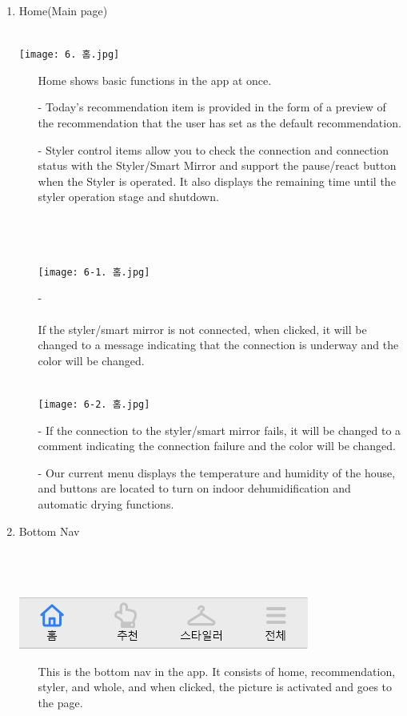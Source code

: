 \documentclass[conference]{IEEEtran}
\begin{document}
\begin{enumerate}
\begin{enumerate}
\end{enumerate}
\item Home(Main page)\\ \\
\centerline{\texttt{[image: 6. 홈.jpg]}}
\begin{itemize}
    \item[] Home shows basic functions in the app at once.
\end{itemize}
 \begin{enumerate}
 \item[-] Today's recommendation item is provided in the form of a preview of the recommendation that the user has set as the default recommendation.
 \item[-] Styler control items allow you to check the connection and connection status with the Styler/Smart Mirror and support the pause/react button when the Styler is operated. It also displays the remaining time until the styler operation stage and shutdown.\\ \\ \\ \\
 \centerline{\texttt{[image: 6-1. 홈.jpg]}}
 \break
 \item[-] \\ \\ If the styler/smart mirror is not connected, when clicked, it will be changed to a message indicating that the connection is underway and the color will be changed.\\\\
 \centerline{\texttt{[image: 6-2. 홈.jpg]}}
 \break
 \item[-] If the connection to the styler/smart mirror fails, it will be changed to a comment indicating the connection failure and the color will be changed.
 \item[-] Our current menu displays the temperature and humidity of the house, and buttons are located to turn on indoor dehumidification and automatic drying functions.\\
 \end{enumerate}
 \item Bottom Nav \\ \\ \\ \\
 \centerline{\includegraphics[scale=0.5]{6-3. 하단 nav.jpg}}
 \break
 \begin{itemize}
    \item[] This is the bottom nav in the app. It consists of home, recommendation, styler, and whole, and when clicked, the picture is activated and goes to the page.
\end{itemize}
\end{enumerate}
\end{document}
